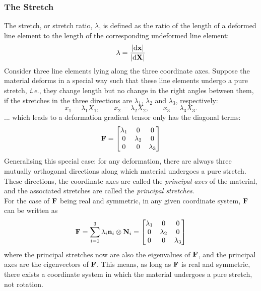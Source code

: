 \documentclass[12pt, a4paper]{article}
\numberwithin{equation}{section}
\begin{document}
\subsubsection{The Stretch}
The stretch, or stretch ratio, $\lambda$, is defined as the ratio of the length of a deformed line element to the length of the corresponding undeformed line element: 
\begin{equation}
    \lambda = \frac{\vert \mathrm{d} {\bf x}\vert}{\vert \mathrm{d} {\bf X}\vert}
\end{equation}
Consider three line elements lying along the three coordinate axes. Suppose the material deforms in a special way such that these line elements undergo a pure stretch, \textit{i.e.}, they change length but no change in the right angles between them, if the stretches in the three directions are $\lambda_1$, $\lambda_2$ and $\lambda_3$, respectively:
\[
    x_1  = \lambda_1 X_1, \quad \quad 
    x_2  = \lambda_2 X_2, \quad \quad 
    x_3  = \lambda_3 X_3.
\]
... which leads to a deformation gradient tensor only has the diagonal terms:
\[
    \mathbf{F} = \begin{bmatrix}
        \lambda_1 & 0 & 0 \\
        0 & \lambda_2 & 0 \\
        0 & 0 & \lambda_3
    \end{bmatrix}
\]
Generalising this special case: for any deformation, there are always three mutually orthogonal directions along which material undergoes a pure stretch. These directions, the coordinate axes are called the \textit{principal axes} of the material, and the associated stretches are called the \textit{principal stretches}.\\

For the case of $\bf F$ being real and symmetric, in any given coordinate system, $\bf F$ can be written as
\[
    \mathbf{F} = \sum_{i=1}^3 \lambda_i \mathbf{n}_i \otimes \mathbf{N}_i = 
    \begin{bmatrix}
        \lambda_1 & 0 & 0 \\
        0 & \lambda_2 & 0 \\
        0 & 0 & \lambda_3
    \end{bmatrix}
\]
where the principal stretches now are also the eigenvalues of $\bf F$, and the principal axes are the eigenvectors of $\bf F$. This means, as long as $\bf F$ is real and symmetric, there exists a coordinate system in which the material undergoes a pure stretch, not rotation.


\end{document}
